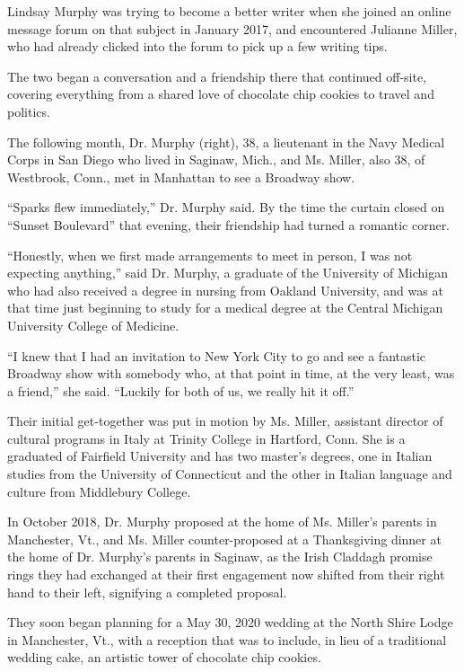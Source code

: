 Lindsay Murphy was trying to become a better writer when she joined an
online message forum on that subject in January 2017, and encountered
Julianne Miller, who had already clicked into the forum to pick up a few
writing tips.

The two began a conversation and a friendship there that continued
off-site, covering everything from a shared love of chocolate chip
cookies to travel and politics.

The following month, Dr. Murphy (right), 38, a lieutenant in the Navy
Medical Corps in San Diego who lived in Saginaw, Mich., and Ms. Miller,
also 38, of Westbrook, Conn., met in Manhattan to see a Broadway show.

``Sparks flew immediately,'' Dr. Murphy said. By the time the curtain
closed on ``Sunset Boulevard'' that evening, their friendship had turned
a romantic corner.

``Honestly, when we first made arrangements to meet in person, I was not
expecting anything,'' said Dr. Murphy, a graduate of the University of
Michigan who had also received a degree in nursing from Oakland
University, and was at that time just beginning to study for a medical
degree at the Central Michigan University College of Medicine.

``I knew that I had an invitation to New York City to go and see a
fantastic Broadway show with somebody who, at that point in time, at the
very least, was a friend,'' she said. ``Luckily for both of us, we
really hit it off.''

Their initial get-together was put in motion by Ms. Miller, assistant
director of cultural programs in Italy at Trinity College in Hartford,
Conn. She is a graduated of Fairfield University and has two master's
degrees, one in Italian studies from the University of Connecticut and
the other in Italian language and culture from Middlebury College.

In October 2018, Dr. Murphy proposed at the home of Ms. Miller's parents
in Manchester, Vt., and Ms. Miller counter-proposed at a Thanksgiving
dinner at the home of Dr. Murphy's parents in Saginaw, as the Irish
Claddagh promise rings they had exchanged at their first engagement now
shifted from their right hand to their left, signifying a completed
proposal.

They soon began planning for a May 30, 2020 wedding at the North Shire
Lodge in Manchester, Vt., with a reception that was to include, in lieu
of a traditional wedding cake, an artistic tower of chocolate chip
cookies.

